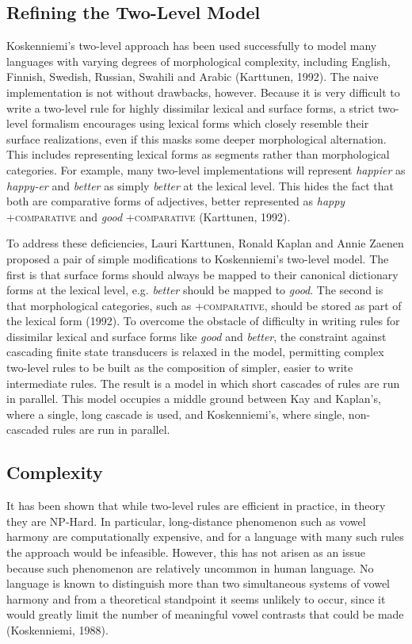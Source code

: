 \documentclass[12pt]{article}
\begin{document}
\subsection{Refining the Two-Level Model}
Koskenniemi's two-level approach has been used successfully to model many languages with varying degrees of morphological complexity, including English, Finnish, Swedish, Russian, Swahili and Arabic (Karttunen, 1992). The naive implementation is not without drawbacks, however. Because it is very difficult to write a two-level rule for highly dissimilar lexical and surface forms, a strict two-level formalism encourages using lexical forms which closely resemble their surface realizations, even if this masks some deeper morphological alternation. This includes representing lexical forms as segments rather than morphological categories. For example, many two-level implementations will represent \textit{happier} as \textit{happy-er} and \textit{better} as simply \textit{better} at the lexical level. This hides the fact that both are comparative forms of adjectives, better represented as \textit{happy} +\textsc{comparative} and \textit{good} +\textsc{comparative} (Karttunen, 1992).

To address these deficiencies, Lauri Karttunen, Ronald Kaplan and Annie Zaenen proposed a pair of simple modifications to Koskenniemi's two-level model. The first is that surface forms should always be mapped to their canonical dictionary forms at the lexical level, e.g. \textit{better} should be mapped to \textit{good}. The second is that morphological categories, such as +\textsc{comparative}, should be stored as part of the lexical form (1992). To overcome the obstacle of difficulty in writing rules for dissimilar lexical and surface forms like \textit{good} and \textit{better}, the constraint against cascading finite state transducers is relaxed in the model, permitting complex two-level rules to be built as the composition of simpler, easier to write intermediate rules. The result is a model in which short cascades of rules are run in parallel. This model occupies a middle ground between Kay and Kaplan's, where a single, long cascade is used, and Koskenniemi's, where single, non-cascaded rules are run in parallel.

\subsection{Complexity}
It has been shown that while two-level rules are efficient in practice, in theory they are NP-Hard. In particular, long-distance phenomenon such as vowel harmony are computationally expensive, and for a language with many such rules the approach would be infeasible. However, this has not arisen as an issue because such phenomenon are relatively uncommon in human language. No language is known to distinguish more than two simultaneous systems of vowel harmony and from a theoretical standpoint it seems unlikely to occur, since it would greatly limit the number of meaningful vowel contrasts that could be made (Koskenniemi, 1988).
\end{document}
